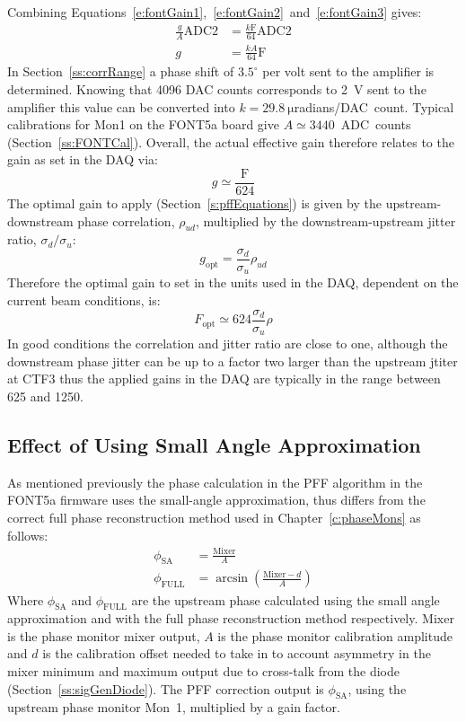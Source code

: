 Combining Equations~\ref{e:fontGain1},~\ref{e:fontGain2}~and~\ref{e:fontGain3} gives:
\begin{align}
\frac{g}{A}\mathrm{ADC2} &= \frac{k\mathrm{F}}{64}\mathrm{ADC2} \nonumber \\
g &= \frac{kA}{64}\mathrm{F} \label{e:fontGain4}
\end{align}
In Section~\ref{ss:corrRange} a phase shift of \(3.5^\circ\) per volt sent to the amplifier is determined. Knowing that 4096 DAC counts corresponds to 2~V sent to the amplifier this value can be converted into \(k = 29.8~\mathrm{\mu}\)radians/DAC~count. Typical calibrations for Mon1 on the FONT5a board give \(A \simeq 3440\)~ADC~counts (Section~\ref{ss:FONTCal}). Overall, the actual effective gain therefore relates to the gain as set in the DAQ via:
\begin{equation}
g \simeq \frac{\mathrm{F}}{624}
\end{equation}
The optimal gain to apply (Section~\ref{s:pffEquations}) is given by the upstream-downstream phase correlation, \(\rho_{ud}\), multiplied by the downstream-upstream jitter ratio, \(\sigma_{d}/\sigma_{u}\):
\begin{equation}
g_{\mathrm{opt}} = \frac{\sigma_{d}}{\sigma_{u}} \rho_{ud}  
\end{equation}
Therefore the optimal gain to set in the units used in the DAQ, dependent on the current beam conditions, is:
\begin{equation}
F_{\mathrm{opt}} \simeq 624 \frac{\sigma_{d}}{\sigma_{u}} \rho
\label{e:fontOptGain}
\end{equation}
In good conditions the correlation and jitter ratio are close to one, although the downstream phase jitter can be up to a factor two larger than the upstream jtiter at CTF3 thus the applied gains in the DAQ are typically in the range between 625 and 1250.

\subsection{Effect of Using Small Angle Approximation}
\label{ss:fontSmallAng}

As mentioned previously the phase calculation in the PFF algorithm in the FONT5a firmware uses the small-angle approximation, thus differs from the correct full phase reconstruction method used in Chapter~\ref{c:phaseMons} as follows:
\begin{align}
\phi_{\mathrm{SA}} &= \frac{\mathrm{Mixer}}{A} \\
\phi_{\mathrm{FULL}} &= \arcsin\left(\frac{\mathrm{Mixer}-d}{A}\right)
\end{align}
Where \(\phi_{\mathrm{SA}}\) and \(\phi_{\mathrm{FULL}}\) are the upstream phase calculated using the small angle approximation
and with the full phase reconstruction method respectively. \(\mathrm{Mixer}\) is the phase monitor mixer output, \(A\) is the phase monitor calibration amplitude and \(d\) is the calibration offset needed to take in to account asymmetry in the mixer minimum and maximum output due to cross-talk from the diode (Section~\ref{ss:sigGenDiode}).
The PFF correction output is \(\phi_{\mathrm{SA}}\), using the upstream 
phase monitor Mon~1, multiplied by a gain factor.

